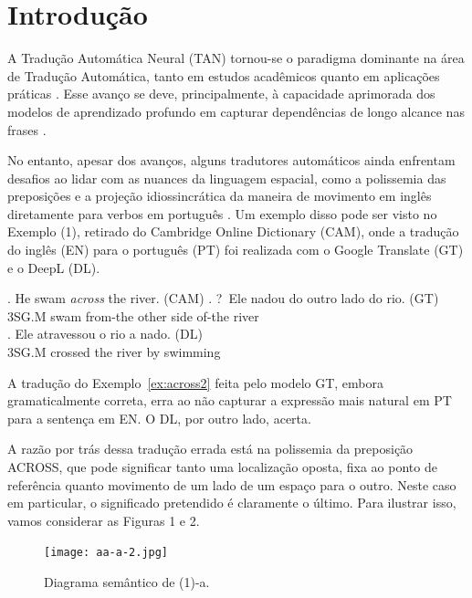\documentclass[a4paper, twocolumn, 11pt, twoside]{article}
\begin{document}


\section{Introdução}

A Tradução Automática Neural (TAN) tornou-se o paradigma dominante na área de Tradução Automática, tanto em estudos acadêmicos quanto em aplicações práticas \citep{dabre2020survey}. Esse avanço se deve, principalmente, à capacidade aprimorada dos modelos de aprendizado profundo em capturar dependências de longo alcance nas frases \citep{vaswani2017attention, yang2020survey}.

No entanto, apesar dos avanços, alguns tradutores automáticos ainda enfrentam desafios ao lidar com as nuances da linguagem espacial, como a polissemia das preposições e a projeção idiossincrática da maneira de movimento em inglês diretamente para verbos em português \citep{McCleary-Viotti-2004}. Um exemplo disso pode ser visto no Exemplo (1), retirado do Cambridge Online Dictionary (CAM), onde a tradução do inglês (EN) para o português (PT) foi realizada com o Google Translate (GT) e o DeepL (DL).

\footnotesize
  \ex. He swam \emph{across} the river. (CAM)\label{ex:across2}
  \ag. ?~Ele nadou do outro lado do rio. (GT) \\  
  3SG.M swam from-the other side of-the river\\ 
  \bg. Ele atravessou o rio a nado. (DL) \\ 
  3SG.M crossed the river by swimming\\
  \par
\normalsize
  
A tradução do Exemplo~\ref{ex:across2} feita pelo modelo GT, embora gramaticalmente correta, erra ao não capturar a expressão mais natural em PT para a sentença em EN. O DL, por outro lado, acerta.
  
A razão por trás dessa tradução errada está na polissemia da preposição ACROSS, que pode significar tanto uma localização oposta, fixa ao ponto de referência quanto movimento de um lado de um espaço para o outro. Neste caso em particular, o significado pretendido é claramente o último. Para ilustrar isso, vamos considerar as Figuras 1 e 2.

\begin{figure}[ht]
  \centering
  \texttt{[image: aa-a-2.jpg]}
  \caption{Diagrama semântico de (1)-a.}\label{fig:across-1a}
\end{figure}
\end{document}

